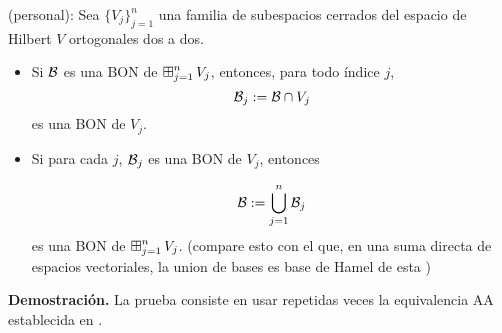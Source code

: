 \begin{lema} \label{lema: BONs de sumas ortogonales}
(personal): Sea $\{ V_{j} \}_{j=1}^{n}$ una familia
de subespacios cerrados del espacio de Hilbert $V$ ortogonales
dos a dos. 
\begin{itemize}
\item Si $\mathcal{B}$ es una BON de $\operatorname*{{\boxplus}}_{j =1 }^{n} V_{j}$,
entonces, para todo índice $j$,
\[
\mathcal{B}_{j}:= \mathcal{B} \cap V_{j}
\]
es una BON de $V_{j}$. 

\item Si para cada $j$, $\mathcal{B}_{j}$ es una
BON de $V_{j}$, entonces

\[
\mathcal{B}:= \bigcup\limits_{j=1}^{n}{\mathcal{B}_{j}}
\]
es una BON de $\operatorname*{{\boxplus}}_{j =1 }^{n} V_{j}$.
(compare esto con el que, en una suma directa
de espacios vectoriales, la union de bases es base de Hamel de esta
)
\end{itemize}
\end{lema}
\noindent
\textbf{Demostración.} La prueba consiste en usar
repetidas veces la equivalencia AA 
establecida en .
